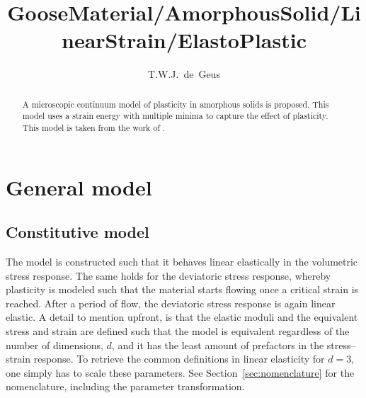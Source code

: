 \documentclass[times,namecite]{goose-article}
\title{%
  GooseMaterial/AmorphousSolid/LinearStrain/ElastoPlastic
}
\author{T.W.J.~de~Geus}
\begin{document}
\maketitle

\begin{abstract}
A microscopic continuum model of plasticity in amorphous solids is proposed. This model uses a strain energy with multiple minima to capture the effect of plasticity. This model is taken from the work of \citet{Jagla2017}.
\end{abstract}


\setcounter{tocdepth}{3}
\tableofcontents

\vfill\newpage
\section{General model}

\subsection{Constitutive model}

The model is constructed such that it behaves linear elastically in the volumetric stress response. The same holds for the deviatoric stress response, whereby plasticity is modeled such that the material starts flowing once a critical strain is reached. After a period of flow, the deviatoric stress response is again linear elastic. A detail to mention upfront, is that the elastic moduli and the equivalent stress and strain are defined such that the model is equivalent regardless of the number of dimensions, $d$, and it has the least amount of prefactors in the stress--strain response. To retrieve the common definitions in linear elasticity for $d = 3$, one simply has to scale these parameters. See Section~\ref{sec:nomenclature} for the nomenclature, including the parameter transformation.
\end{document}
